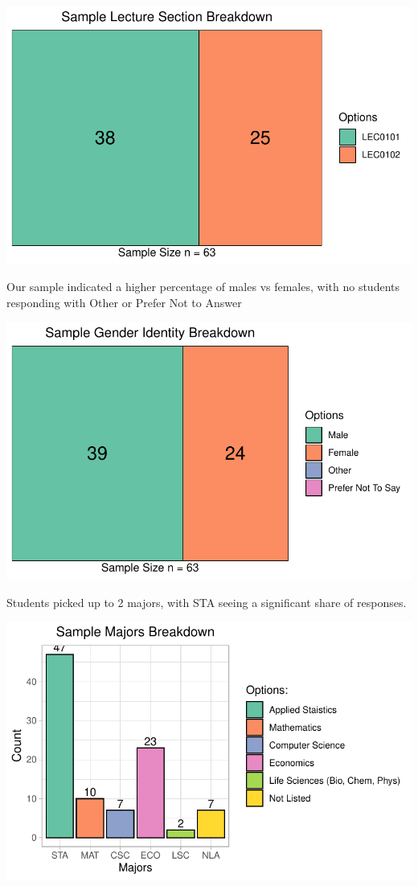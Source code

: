 \documentclass[
  letterpaper,
  DIV=11,
  numbers=noendperiod]{scrartcl}
\begin{document}
\includegraphics{technical_report_files/figure-pdf/p1-1.pdf}

Our sample indicated a higher percentage of males vs females, with no
students responding with Other or Prefer Not to Answer

\includegraphics{technical_report_files/figure-pdf/p2-1.pdf}

Students picked up to 2 majors, with STA seeing a significant share of
responses.

\includegraphics{technical_report_files/figure-pdf/p3-1.pdf}
\end{document}
